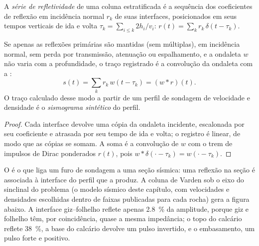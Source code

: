\begin{definition}\label{def:b3:exploration-seismology:synthetic}
A \emph{série de refletividade} de uma coluna estratificada é
a sequência dos coeficientes de reflexão em incidência normal $r_k$ de suas interfaces,
posicionados em seus tempos verticais de ida e volta $\tau_k = \sum_{i \le k} 2h_i/v_i$:
$r(t) = \sum_k r_k\,\delta(t - \tau_k)$.
\end{definition}

\begin{proposition}\label{prop:b3:exploration-seismology:synthetic}
Se apenas as reflexões primárias são mantidas (sem múltiplas), em incidência normal, sem
perda por transmissão, atenuação ou espalhamento, e a ondaleta $w$ não
varia com a profundidade, o traço registrado é a convolução da ondaleta com a
:
\[
  s(t) = \sum_k r_k\,w(t - \tau_k) = (w*r)(t) .
\]
O traço calculado desse modo a partir de um perfil de sondagem de velocidade e densidade é o
\emph{sismograma sintético} do perfil.
\end{proposition}

\begin{proof}
Cada interface devolve uma cópia da ondaleta incidente, escalonada por seu coeficiente
e atrasada por seu tempo de ida e volta; o registro é linear, de modo que as cópias se somam.
A soma é a convolução de $w$ com o trem de impulsos de Dirac ponderados
$r(t)$, pois $w*\delta(\cdot - \tau_k) = w(\cdot - \tau_k)$.
\end{proof}

O  é o que liga um furo de sondagem a uma seção sísmica: uma
reflexão na seção é associada à interface do perfil que a produz.
A coluna de Varden sob o eixo do sinclinal do problema (o modelo sísmico deste
capítulo, com velocidades e densidades escolhidas dentro de faixas publicadas para
cada rocha)
gera a figura abaixo. A interface giz--folhelho reflete apenas
\qty{2.8}{\percent} da amplitude, porque giz e folhelho têm, por coincidência, quase a mesma
impedância; o topo do calcário reflete \qty{38}{\percent},
a base do calcário devolve um pulso invertido, e o embasamento, um pulso forte e
positivo.

